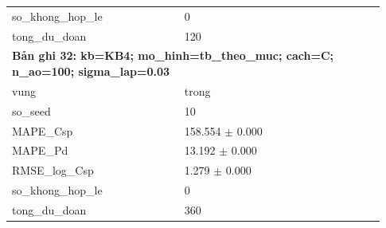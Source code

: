 \begin{longtable}{p{0.43\linewidth}p{0.50\linewidth}}
so\_\allowbreak khong\_\allowbreak hop\_\allowbreak le & 0 \\
tong\_\allowbreak du\_\allowbreak doan & 120 \\
\midrule
\multicolumn{2}{p{0.95\linewidth}}{\textbf{Bản ghi 32: kb=KB4; mo\_hinh=tb\_theo\_muc; cach=C; n\_ao=100; sigma\_lap=0.03}} \\
vung & trong \\
so\_\allowbreak seed & 10 \\
MAPE\_\allowbreak Csp & 158.554 $\pm$ 0.000 \\
MAPE\_\allowbreak Pd & 13.192 $\pm$ 0.000 \\
RMSE\_\allowbreak log\_\allowbreak Csp & 1.279 $\pm$ 0.000 \\
so\_\allowbreak khong\_\allowbreak hop\_\allowbreak le & 0 \\
tong\_\allowbreak du\_\allowbreak doan & 360 \\
\midrule
\bottomrule
\end{longtable}
